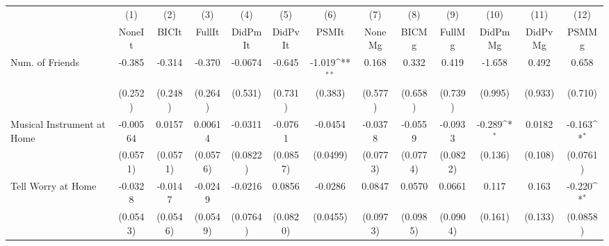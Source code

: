{
\def\sym#1{\ifmmode^{#1}\else\(^{#1}\)\fi}
\begin{tabular}{l*{12}{c}}
\toprule
            &\multicolumn{1}{c}{(1)}&\multicolumn{1}{c}{(2)}&\multicolumn{1}{c}{(3)}&\multicolumn{1}{c}{(4)}&\multicolumn{1}{c}{(5)}&\multicolumn{1}{c}{(6)}&\multicolumn{1}{c}{(7)}&\multicolumn{1}{c}{(8)}&\multicolumn{1}{c}{(9)}&\multicolumn{1}{c}{(10)}&\multicolumn{1}{c}{(11)}&\multicolumn{1}{c}{(12)}\\
            &\multicolumn{1}{c}{NoneIt}&\multicolumn{1}{c}{BICIt}&\multicolumn{1}{c}{FullIt}&\multicolumn{1}{c}{DidPmIt}&\multicolumn{1}{c}{DidPvIt}&\multicolumn{1}{c}{PSMIt}&\multicolumn{1}{c}{NoneMg}&\multicolumn{1}{c}{BICMg}&\multicolumn{1}{c}{FullMg}&\multicolumn{1}{c}{DidPmMg}&\multicolumn{1}{c}{DidPvMg}&\multicolumn{1}{c}{PSMMg}\\
\midrule
Num. of Friends&      -0.385         &      -0.314         &      -0.370         &     -0.0674         &      -0.645         &      -1.019\sym{**} &       0.168         &       0.332         &       0.419         &      -1.658         &       0.492         &       0.658         \\
            &     (0.252)         &     (0.248)         &     (0.264)         &     (0.531)         &     (0.731)         &     (0.383)         &     (0.577)         &     (0.658)         &     (0.739)         &     (0.995)         &     (0.933)         &     (0.710)         \\
\addlinespace
Musical Instrument at Home&    -0.00564         &      0.0157         &     0.00614         &     -0.0311         &     -0.0761         &     -0.0454         &     -0.0378         &     -0.0559         &     -0.0933         &      -0.289\sym{*}  &      0.0182         &      -0.163\sym{*}  \\
            &    (0.0571)         &    (0.0571)         &    (0.0576)         &    (0.0822)         &    (0.0857)         &    (0.0499)         &    (0.0773)         &    (0.0774)         &    (0.0822)         &     (0.136)         &     (0.108)         &    (0.0761)         \\
\addlinespace
Tell Worry at Home&     -0.0328         &     -0.0147         &     -0.0249         &     -0.0216         &      0.0856         &     -0.0286         &      0.0847         &      0.0570         &      0.0661         &       0.117         &       0.163         &      -0.220\sym{*}  \\
            &    (0.0543)         &    (0.0546)         &    (0.0549)         &    (0.0764)         &    (0.0820)         &    (0.0455)         &    (0.0973)         &    (0.0985)         &    (0.0904)         &     (0.161)         &     (0.133)         &    (0.0858)         \\

\end{tabular}}
